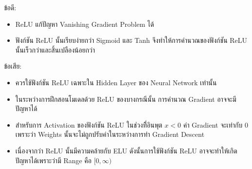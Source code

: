 \noindent ข้อดี:
\begin{itemize}[topsep=0pt,noitemsep]\setlength\itemsep{0.5em}
  \item ReLU แก้ปัญหา Vanishing Gradient Problem ได้

  \item ฟังก์ชัน ReLU นั้นเรียบง่ายกว่า Sigmoid และ Tanh จึงทำให้การคำนวณของฟังก์ชัน ReLU นั้นเร็วกว่าและสิ้นเปลืองน้อยกว่า
\end{itemize}
%
ข้อเสีย:
\begin{itemize}[topsep=0pt,noitemsep]\setlength\itemsep{0.5em}
  \item ควรใช้ฟังก์ชัน ReLU เฉพาะใน Hidden Layer ของ Neural Network เท่านั้น

  \item ในระหว่างการฝึกสอนโมเดลด้วย ReLU ของบางกรณีนั้น การคำนวณ Gradient อาจจะมีปัญหาได้

  \item สำหรับการ Activation ของฟังก์ชัน ReLU ในช่วงที่ิอินพุต $x < 0$ ค่า Gradient จะเท่ากับ 0 เพราะว่า Weights นั้นจะไม่ถูกปรับค่าในระหว่างการทำ Gradient Descent

  \item เนื่องจากว่า ReLU นั้นมีความคล้ายกับ ELU ดังนั้นการใช้ฟังก์ชัน ReLU อาจจะทำให้เกิดปัญหาได้เพราะว่ามี Range คือ $[0,\infty)$
\end{itemize}
%
